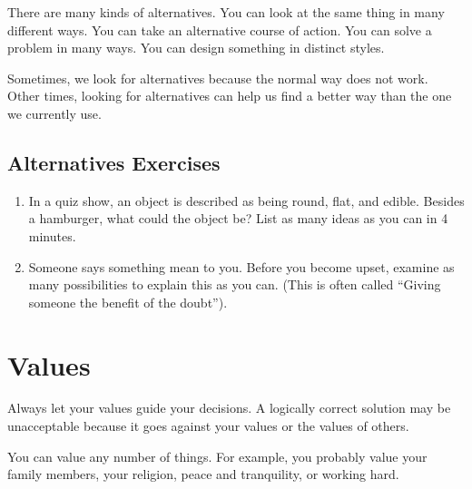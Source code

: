 There are many kinds of alternatives. You can look at the same thing in many different ways. You can take an alternative course of action. You can solve a problem in many ways. You can design something in distinct styles.

Sometimes, we look for alternatives because the normal way does not work. Other times, looking for alternatives can help us find a better way than the one we currently use. 


\section*{Alternatives Exercises}

\begin{enumerate}
	\item In a quiz show, an object is described as being round, flat, and edible. Besides a hamburger, what could the object be? List as many ideas as you can in 4 minutes.
	\item Someone says something mean to you. Before you become upset, examine as many possibilities to explain this as you can. (This is often called ``Giving someone the benefit of the doubt'').
\end{enumerate}


\chapter{Values}

Always let your values guide your decisions. A logically correct solution may be unacceptable because it goes against your values or the values of others.

You can value any number of things. For example, you probably value your family members, your religion, peace and tranquility, or working hard. 


